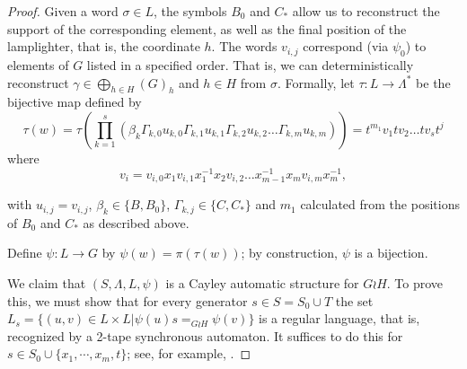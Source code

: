 \documentclass[11pt]{amsart}
\theoremstyle{definition}
\newcommand\h{x}
\begin{document}
\begin{proof}
Given a word $\sigma \in L$, the symbols $B_0$ and $C_*$ allow us to reconstruct the support of the corresponding element, as well as the final position of the lamplighter, that is, the coordinate $h$.
The words $v_{i,j}$ correspond (via $\psi_0$) to elements of $G$ listed in a specified order.  That is, we can deterministically reconstruct $\gamma \in \bigoplus_{h \in H} (G)_h$ and $h \in H$ from $\sigma$.
Formally, let $\tau\colon L \rightarrow \Lambda^*$ be the bijective map defined by
\begin{equation*}
\tau(w) = \tau\left(\prod_{k=1}^s\left(\beta_k\Gamma_{k,0}u_{k,0}\Gamma_{k,1}u_{k,1}\Gamma_{k,2}u_{k,2}\dots \Gamma_{k,m}u_{k,m}\right)\right)  = t^{m_1}v_1tv_2\dots tv_st^j
\end{equation*}
where
\[v_i=v_{i,0}\h_1v_{i,1}\h_1^{-1}\h_2v_{i,2}\dots \h_{m-1}^{-1}\h_mv_{i,m}\h_m^{-1}, \]

\medskip
\noindent
with $u_{i,j} = v_{i,j}$, $\beta_k \in \{B,B_0\}$, $\Gamma_{k,j} \in \{C,C_*\}$ and $m_1$ calculated from the positions of $B_0$ and $C_*$ as described above.


Define $\psi\colon L\to G$ by
 $\psi(w)=\pi(\tau(w))$; by construction, $\psi$  is a bijection.



We claim that $(S,\Lambda,L,\psi)$ is a Cayley automatic structure for $G \wr H$.
To prove this,
we must show that for every generator $s \in S=S_0\cup T$ the set $L_s = \{(u,v) \in L \times L | \psi(u)s =_{G \wr H} \psi(v) \}$ is a regular language, that is, recognized by a 2-tape synchronous automaton.
It suffices to do this for $s \in S_0 \cup \{x_1, \cdots ,x_m,t\}$; see, for example, \cite[Lemma 9]{cga}.



\end{proof}
\end{document}
